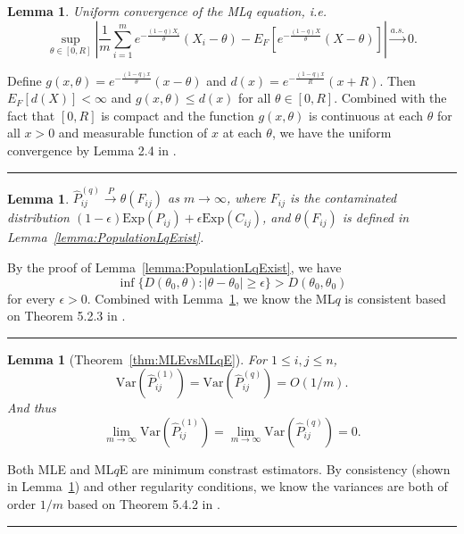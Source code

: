 \documentclass[a4paper]{article}
\newenvironment{proof}{{\bf Proof:  }}{\hfill\rule{2mm}{2mm}}
\newtheorem{lemma}[fact]{Lemma}
\renewcommand{\hat}{\widehat}
\begin{document}
\begin{lemma}
\label{lemma:UniformConvergence}
Uniform convergence of the MLq equation, i.e.
\[
	\sup_{\theta \in [0, R]} \left| \frac{1}{m} \sum_{i=1}^m e^{-\frac{(1-q) X_i}{\theta}}(X_i - \theta) - E_F[e^{-\frac{(1-q) X}{\theta}}(X - \theta)] \right| \stackrel{a.s.}{\to} 0.
\]
\end{lemma}
\begin{proof}
Define $g(x,\theta) = e^{-\frac{(1-q) x}{\theta}}(x - \theta)$ and $d(x) = e^{-\frac{(1-q)x}{R}}(x + R)$. Then $E_F[d(X)] < \infty$ and $g(x,\theta) \le d(x)$ for all $\theta \in [0, R]$.
Combined with the fact that $[0, R]$ is compact and the function $g(x,\theta)$ is continuous at each $\theta$ for all $x > 0$ and measurable function of $x$ at each $\theta$, we have the uniform convergence by Lemma 2.4 in \citep{newey1994large}.
\end{proof}

\begin{lemma}
\label{lemma:ELqConverge}
$\hat{P}_{ij}^{(q)} \stackrel{P}{\to} \theta(F_{ij})$ as $m \to \infty$, where $F_{ij}$ is the contaminated distribution $(1-\epsilon) \mathrm{Exp}(P_{ij}) + \epsilon \mathrm{Exp}(C_{ij})$, and $ \theta(F_{ij})$ is defined in Lemma~\ref{lemma:PopulationLqExist}. 
\end{lemma}
\begin{proof}
By the proof of Lemma~\ref{lemma:PopulationLqExist}, we have
\[
	\inf\{D(\theta_0, \theta): |\theta - \theta_0| \ge \epsilon \} > D(\theta_0, \theta_0)
\]
for every $\epsilon > 0$. Combined with Lemma~\ref{lemma:UniformConvergence}, we know the ML$q$ is consistent based on Theorem 5.2.3 in \citep{bickel2001mathematical}.
\end{proof}

\begin{lemma}[Theorem~\ref{thm:MLEvsMLqE}]
\label{lemma:VarLqlVarMLEproof}
For $1 \le i, j \le n$, 
\[
	\mathrm{Var}(\hat{P}^{(1)}_{ij})
    = \mathrm{Var}(\hat{P}^{(q)}_{ij}) = O(1/m).
\]
And thus
\[
	\lim_{m \to \infty} \mathrm{Var}(\hat{P}^{(1)}_{ij})
    = \lim_{m \to \infty} \mathrm{Var}(\hat{P}^{(q)}_{ij}) = 0.
\]
\end{lemma}
\begin{proof}
Both MLE and ML$q$E are minimum constrast estimators. By consistency (shown in Lemma~\ref{lemma:ELqConverge}) and other regularity conditions, we know the variances are both of order $1/m$ based on Theorem 5.4.2 in \citep{bickel2001mathematical}.
\end{proof}
\end{document}
